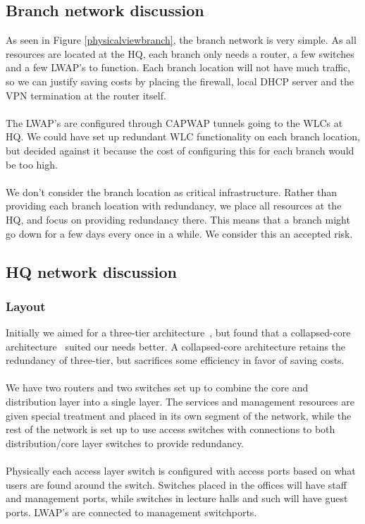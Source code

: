 
\subsection{Branch network discussion}


As seen in Figure \ref{physicalviewbranch}, the branch network is very simple. As all resources are located at the HQ, each branch only needs a router, a few switches and a few LWAP's to function. Each branch location will not have much traffic, so we can justify saving costs by placing the firewall, local DHCP server and the VPN termination at the router itself.
\\
\\
The LWAP's are configured through CAPWAP tunnels going to the WLCs at HQ. We could have set up redundant WLC functionality on each branch location, but decided against it because the cost of configuring this for each branch would be too high.
\\
\\
We don't consider the branch location as critical infrastructure. Rather than providing each branch location with redundancy, we place all resources at the HQ, and focus on providing redundancy there. This means that a branch might go down for a few days every once in a while. We consider this an accepted risk.

\subsection{HQ network discussion}

\subsubsection{Layout}

Initially we aimed for a three-tier architecture~\cite{threetier}, but found that a collapsed-core architecture~\cite{collapsedcore} suited our needs better. A collapsed-core architecture retains the redundancy of three-tier, but sacrifices some efficiency in favor of saving costs.
\\
\\
We have two routers and two switches set up to combine the core and distribution layer into a single layer. The services and management resources are given special treatment and placed in its own segment of the network, while the rest of the network is set up to use access switches with connections to both distribution/core layer switches to provide redundancy.
\\
\\
Physically each access layer switch is configured with access ports based on what users are found around the switch. Switches placed in the offices will have staff and management ports, while switches in lecture halls and such will have guest ports. LWAP's are connected to management switchports.

